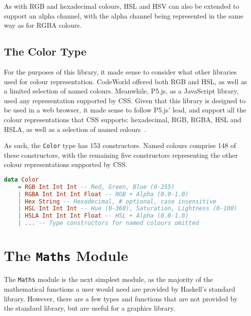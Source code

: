 \documentclass[../main.tex]{subfiles}
\begin{document}
                As with RGB and hexadecimal colours, HSL and HSV can also be extended to
                    support an alpha channel, with the alpha channel being represented in the same
                    way as for RGBA colours.

        \subsection{The Color Type}
            For the purposes of this library, it made sense to consider what other
                libraries used for colour representation.
            CodeWorld offered both RGB and HSL, as well as a limited selection of named
                colours.
            Meanwhile, P5.js, as a JavaScript library, used any representation supported by
                CSS.
            Given that this library is designed to be used in a web browser, it made sense
                to follow P5.js' lead, and support all the colour representations that CSS
                supports: hexadecimal, RGB, RGBA, HSL and HSLA, as well as a selection of named
                colours~\citep{cssColours}.

            As such, the \texttt{Color} type has 153 constructors.
            Named colours comprise 148 of these constructors, with the remaining five
                constructors representing the other colour representations supported by CSS.

            \begin{lstlisting}[language={Haskell}, label={lst:color}, caption={The \texttt{Color} type definition.
                Named colours have been omitted, but are included in the actual implementation, as seen 
                in Appendix~\ref{app:code}.}]
data Color
    = RGB Int Int Int -- Red, Green, Blue (0-255)
    | RGBA Int Int Int Float -- RGB + Alpha (0.0-1.0)
    | Hex String -- Hexadecimal, # optional, case insensitive
    | HSL Int Int Int -- Hue (0-360), Saturation, Lightness (0-100)
    | HSLA Int Int Int Float -- HSL + Alpha (0.0-1.0)
    | ... -- Type constructors for named colours omitted\end{lstlisting}

    \section{The \texttt{Maths}
        Module} The \texttt{Maths} module is the next simplest module, as the majority
            of the mathematical functions a user would need are provided by Haskell's
            standard library.
        However, there are a few types and functions that are not provided by the
            standard library, but are useful for a graphics library.
\end{document}
